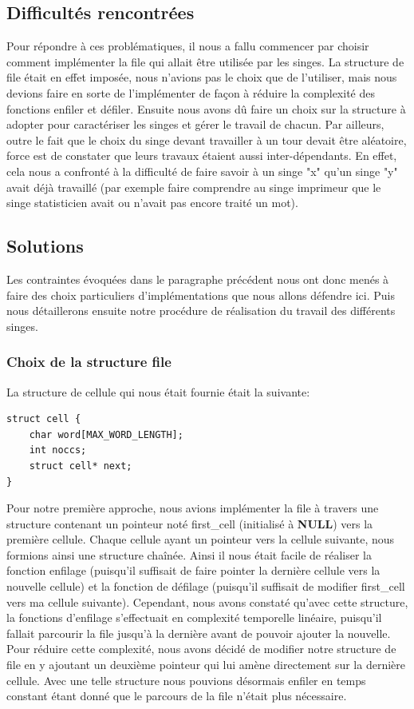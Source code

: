\documentclass[12pt]{article}
\begin{document}
\subsection{Difficultés rencontrées}
Pour répondre à ces problématiques, il nous a fallu commencer par choisir comment implémenter la file qui allait être utilisée par les singes. La structure de file était en effet imposée, nous n'avions pas le choix que de l'utiliser, mais nous devions faire en sorte de l'implémenter de façon à réduire la complexité des fonctions enfiler et défiler. Ensuite nous avons dû faire un choix sur la structure à adopter pour caractériser les singes et gérer le travail de chacun. Par ailleurs, outre le fait que le choix du singe devant travailler à un tour devait être aléatoire, force est de constater que leurs travaux étaient aussi inter-dépendants. En effet, cela nous a confronté à la difficulté de faire savoir à un singe "x" qu'un singe "y" avait déjà travaillé (par exemple faire comprendre au singe imprimeur que le singe statisticien avait ou n'avait pas encore traité un mot).

\subsection{Solutions}
Les contraintes évoquées dans le paragraphe précédent nous ont donc menés à faire des choix particuliers d'implémentations que nous allons défendre ici. Puis nous détaillerons ensuite notre procédure de réalisation du travail des différents singes.

\subsubsection{Choix de la structure file}
La structure de cellule qui nous était fournie était la suivante:
\begin{lstlisting}
struct cell {
    char word[MAX_WORD_LENGTH];
    int noccs;
    struct cell* next;
}
\end{lstlisting}
\bigbreak

Pour notre première approche, nous avions implémenter la file à travers une structure contenant un pointeur noté first\_cell (initialisé à \textbf{NULL}) vers la première cellule. Chaque cellule ayant un pointeur vers la cellule suivante, nous formions ainsi une structure chaînée. Ainsi il nous était facile de réaliser la fonction enfilage (puisqu'il suffisait de faire pointer la dernière cellule vers la nouvelle cellule) et la fonction de défilage (puisqu'il suffisait de modifier first\_cell vers ma cellule suivante).   
Cependant, nous avons constaté qu'avec cette structure, la fonctions d'enfilage s'effectuait en complexité temporelle linéaire, puisqu'il fallait parcourir la file jusqu'à la dernière avant de pouvoir ajouter la nouvelle. 
Pour réduire cette complexité, nous avons décidé de modifier notre structure de file en y ajoutant un deuxième pointeur qui lui amène directement sur la dernière cellule.
Avec une telle structure nous pouvions désormais enfiler en temps constant étant donné que le parcours de la file n'était plus nécessaire.
\end{document}
